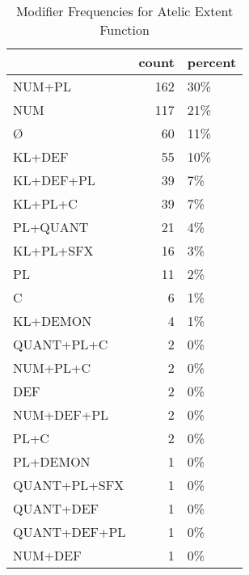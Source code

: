 \begin{table}[htbp!]
\centering
\caption{Modifier Frequencies for Atelic Extent Function}
\label{table:atelext_mod_cp}
\begin{tabular}{lrl}
\toprule
{} &  count & percent \\
\midrule
NUM+PL       &    162 &     30\% \\
NUM          &    117 &     21\% \\
Ø            &     60 &     11\% \\
KL+DEF       &     55 &     10\% \\
KL+DEF+PL    &     39 &      7\% \\
KL+PL+C      &     39 &      7\% \\
PL+QUANT     &     21 &      4\% \\
KL+PL+SFX    &     16 &      3\% \\
PL           &     11 &      2\% \\
C            &      6 &      1\% \\
KL+DEMON     &      4 &      1\% \\
QUANT+PL+C   &      2 &      0\% \\
NUM+PL+C     &      2 &      0\% \\
DEF          &      2 &      0\% \\
NUM+DEF+PL   &      2 &      0\% \\
PL+C         &      2 &      0\% \\
PL+DEMON     &      1 &      0\% \\
QUANT+PL+SFX &      1 &      0\% \\
QUANT+DEF    &      1 &      0\% \\
QUANT+DEF+PL &      1 &      0\% \\
NUM+DEF      &      1 &      0\% \\
\bottomrule
\end{tabular}
\end{table}

